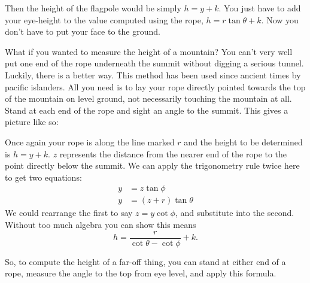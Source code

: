 \documentclass{article}
\begin{document}
Then the height of the flagpole would be simply $h = y+k$. You just have to add your eye-height to the value computed using the rope, $h=r\tan\theta+k$. Now you don't have to put your face to the ground.

What if you wanted to measure the height of a mountain? You can't very well put one end of the rope underneath the summit without digging a serious tunnel. Luckily, there is a better way. This method has been used since ancient times by pacific islanders. All you need is to lay your rope directly pointed towards the top of the mountain on level ground, not necessarily touching the mountain at all. Stand at each end of the rope and sight an angle to the summit. This gives a picture like so:

\begin{figure}[h!]
\centering
{}
\end{figure}

Once again your rope is along the line marked $r$ and the height to be determined is $h=y+k$. $z$ represents the distance from the nearer end of the rope to the point directly below the summit. We can apply the trigonometry rule twice here to get two equations:
\begin{align*}
y &= z \tan \phi\\
y &= (z+r) \tan \theta
\end{align*}
We could rearrange the first to say $z = y \cot \phi$, and substitute into the second. Without too much algebra you can show this means
\[
h = \frac{r}{\cot \theta -\cot \phi}+k.
\]

So, to compute the height of a far-off thing, you can stand at either end of a rope, measure the angle to the top from eye level, and apply this formula.
\end{document}
